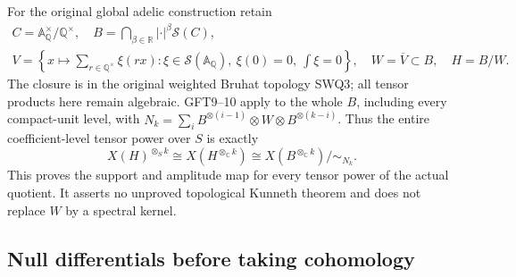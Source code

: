 For the original global adelic construction retain
\begin{equation}\tag{GFT11}
 \begin{gathered}
 C=\mathbb A_{\mathbb Q}^\times/\mathbb Q^\times,
 \quad B=\bigcap_{\beta\in\mathbb R}|\cdot|^\beta\mathcal S(C),\\
 V=\left\{x\mapsto\sum_{r\in\mathbb Q^\times}\xi(rx):
      \xi\in\mathcal S(\mathbb A_{\mathbb Q}),\
      \xi(0)=0,\ \int\xi=0\right\},\quad
 W=\overline V\subset B,\quad H=B/W.
 \end{gathered}
\end{equation}
The closure is in the original weighted Bruhat topology SWQ3;
all tensor products here remain algebraic. GFT9--10 apply to the
whole $B$, including every compact-unit level, with
$N_k=\sum_i B^{\otimes(i-1)}\otimes W\otimes
B^{\otimes(k-i)}$. Thus the entire coefficient-level tensor power
over $S$ is exactly
\begin{equation}\tag{GFT12}
 X(H)^{\otimes_S k}
     \cong X(H^{\otimes_{\mathbb C}k})
     \cong X(B^{\otimes_{\mathbb C}k})/\!\sim_{N_k}.
\end{equation}
This proves the support and amplitude map for every tensor
power of the actual quotient. It asserts no unproved topological
Kunneth theorem and does not replace $W$ by a spectral kernel.

\subsection{Null differentials before taking cohomology}

